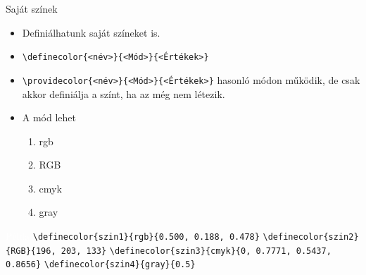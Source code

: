 \documentclass[aspectratio=1610, dvipsnames, xcolor=table]{beamer}
\begin{document}
    \begin{frame}[fragile]{Saját színek}
        \begin{itemize}
            \item {}Definiálhatunk saját színeket is.
            \item {}\verb!\definecolor{<név>}{<Mód>}{<Értékek>}!
            \item {}\verb!\providecolor{<név>}{<Mód>}{<Értékek>}! hasonló módon működik, de csak akkor definiálja a színt, ha az még nem létezik.
            \item {}A mód lehet
            \begin{enumerate}
                \item {}rgb
                \item {}RGB
                \item {}cmyk
                \item {}gray    
            \end{enumerate}
        \end{itemize}                                                        
        
        \begin{exampleblock}{\textcolor{white}{Példa}}
            \verb!\definecolor{szin1}{rgb}{0.500, 0.188, 0.478}! \hfill {} \hspace{2cm}
            \verb!\definecolor{szin2}{RGB}{196, 203, 133}! \hfill {} \hspace{2cm}
            \verb!\definecolor{szin3}{cmyk}{0, 0.7771, 0.5437, 0.8656}! \hfill {} \hspace{2cm}
            \verb!\definecolor{szin4}{gray}{0.5}! \hfill {} \hspace{2cm}
        \end{exampleblock}           
    \end{frame}
    
\end{document}
